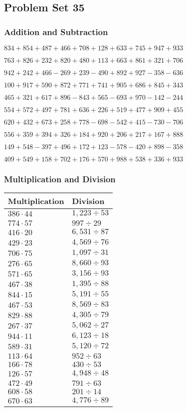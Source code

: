 \hypertarget{problem-set-35-2}{%
\subsection{Problem Set 35}\label{problem-set-35-2}}

\hypertarget{addition-and-subtraction-135}{%
\subsubsection{Addition and
Subtraction}\label{addition-and-subtraction-135}}

\(834 + 854 + 487 + 466 + 708 + 128 + 633 + 745 + 947 + 933\)

\(763 + 826 + 232 + 820 + 480 + 113 + 663 + 861 + 321 + 706\)

\(942 + 242 + 466 - 269 + 239 - 490 + 892 + 927 - 358 - 636\)

\(100 + 917 + 590 + 872 + 771 + 741 + 905 + 686 + 845 + 343\)

\(465 + 321 + 617 + 896 - 843 + 565 - 693 + 970 - 142 - 244\)

\(554 + 572 + 497 + 781 + 636 + 226 + 519 + 477 + 909 + 455\)

\(620 + 432 + 673 + 258 + 778 - 698 - 542 + 415 - 730 - 706\)

\(556 + 359 + 394 + 326 + 184 + 920 + 206 + 217 + 167 + 888\)

\(149 + 548 - 397 + 496 + 172 + 123 - 578 - 420 + 898 - 358\)

\(409 + 549 + 158 + 702 + 176 + 570 + 988 + 538 + 336 + 933\)

\hypertarget{multiplication-and-division-135}{%
\subsubsection{Multiplication and
Division}\label{multiplication-and-division-135}}

\begin{longtable}[]{@{}ll@{}}
\toprule
Multiplication & Division\tabularnewline
\midrule
\endhead
\(386 \cdot 44\) & \(1,223÷53\)\tabularnewline
\(774 \cdot 57\) & \(997÷29\)\tabularnewline
\(416 \cdot 20\) & \(6,531÷87\)\tabularnewline
\(429 \cdot 23\) & \(4,569÷76\)\tabularnewline
\(706 \cdot 75\) & \(1,097÷31\)\tabularnewline
\(276 \cdot 65\) & \(8,660÷93\)\tabularnewline
\(571 \cdot 65\) & \(3,156÷93\)\tabularnewline
\(467 \cdot 38\) & \(1,395÷88\)\tabularnewline
\(844 \cdot 15\) & \(5,191÷55\)\tabularnewline
\(467 \cdot 53\) & \(8,569÷83\)\tabularnewline
\(829 \cdot 88\) & \(4,305÷79\)\tabularnewline
\(267 \cdot 37\) & \(5,062÷27\)\tabularnewline
\(944 \cdot 11\) & \(6,123÷18\)\tabularnewline
\(589 \cdot 31\) & \(5,120÷72\)\tabularnewline
\(113 \cdot 64\) & \(952÷63\)\tabularnewline
\(166 \cdot 78\) & \(430÷53\)\tabularnewline
\(126 \cdot 57\) & \(4,948÷48\)\tabularnewline
\(472 \cdot 49\) & \(791÷63\)\tabularnewline
\(608 \cdot 58\) & \(201÷14\)\tabularnewline
\(670 \cdot 63\) & \(4,776÷89\)\tabularnewline
\bottomrule
\end{longtable}


